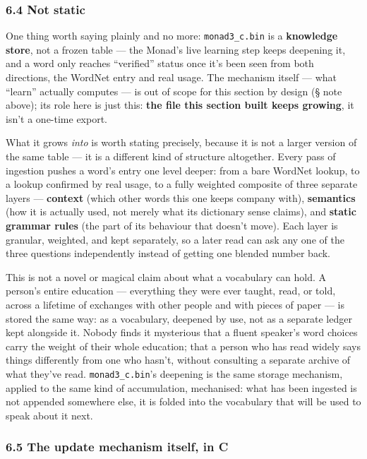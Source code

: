 \documentclass[
  10pt,
]{article}
\begin{document}
\hypertarget{not-static}{%
\subsubsection{6.4 Not static}\label{not-static}}

One thing worth saying plainly and no more: \texttt{monad3\_c.bin} is a
\textbf{knowledge store}, not a frozen table --- the Monad's live
learning step keeps deepening it, and a word only reaches ``verified''
status once it's been seen from both directions, the WordNet entry and
real usage. The mechanism itself --- what ``learn'' actually computes
--- is out of scope for this section by design (§ note above); its role
here is just this: \textbf{the file this section built keeps growing},
it isn't a one-time export.

What it grows \emph{into} is worth stating precisely, because it is not
a larger version of the same table --- it is a different kind of
structure altogether. Every pass of ingestion pushes a word's entry one
level deeper: from a bare WordNet lookup, to a lookup confirmed by real
usage, to a fully weighted composite of three separate layers ---
\textbf{context} (which other words this one keeps company with),
\textbf{semantics} (how it is actually used, not merely what its
dictionary sense claims), and \textbf{static grammar rules} (the part of
its behaviour that doesn't move). Each layer is granular, weighted, and
kept separately, so a later read can ask any one of the three questions
independently instead of getting one blended number back.

This is not a novel or magical claim about what a vocabulary can hold. A
person's entire education --- everything they were ever taught, read, or
told, across a lifetime of exchanges with other people and with pieces
of paper --- is stored the same way: as a vocabulary, deepened by use,
not as a separate ledger kept alongside it. Nobody finds it mysterious
that a fluent speaker's word choices carry the weight of their whole
education; that a person who has read widely says things differently
from one who hasn't, without consulting a separate archive of what
they've read. \texttt{monad3\_c.bin}'s deepening is the same storage
mechanism, applied to the same kind of accumulation, mechanised: what
has been ingested is not appended somewhere else, it is folded into the
vocabulary that will be used to speak about it next.

\hypertarget{the-update-mechanism-itself-in-c}{%
\subsubsection{6.5 The update mechanism itself, in
C}\label{the-update-mechanism-itself-in-c}}
\end{document}
